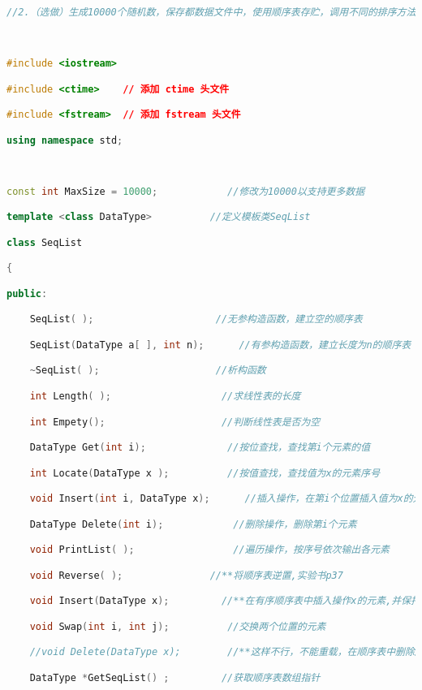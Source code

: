 \begin{lstlisting}[language=C++]
//2.（选做）生成10000个随机数，保存都数据文件中，使用顺序表存贮，调用不同的排序方法，排序后结果保存到数据文件ResultSorted.txt中。

  

#include <iostream>

#include <ctime>    // 添加 ctime 头文件

#include <fstream>  // 添加 fstream 头文件

using namespace std;

  

const int MaxSize = 10000;            //修改为10000以支持更多数据

template <class DataType>          //定义模板类SeqList

class SeqList

{

public:

    SeqList( );                     //无参构造函数，建立空的顺序表

    SeqList(DataType a[ ], int n);      //有参构造函数，建立长度为n的顺序表

    ~SeqList( );                    //析构函数

    int Length( );                   //求线性表的长度

    int Empety();                    //判断线性表是否为空

    DataType Get(int i);              //按位查找，查找第i个元素的值

    int Locate(DataType x );          //按值查找，查找值为x的元素序号

    void Insert(int i, DataType x);      //插入操作，在第i个位置插入值为x的元素

    DataType Delete(int i);            //删除操作，删除第i个元素

    void PrintList( );                 //遍历操作，按序号依次输出各元素

    void Reverse( );               //**将顺序表逆置,实验书p37

    void Insert(DataType x);         //**在有序顺序表中插入操作x的元素,并保持表L仍递增有序

    void Swap(int i, int j);          //交换两个位置的元素

    //void Delete(DataType x);        //**这样不行，不能重载，在顺序表中删除所有元素值为x的元素，要求空间复杂度为O(1)

    DataType *GetSeqList() ;         //获取顺序表数组指针


\end{lstlisting}
